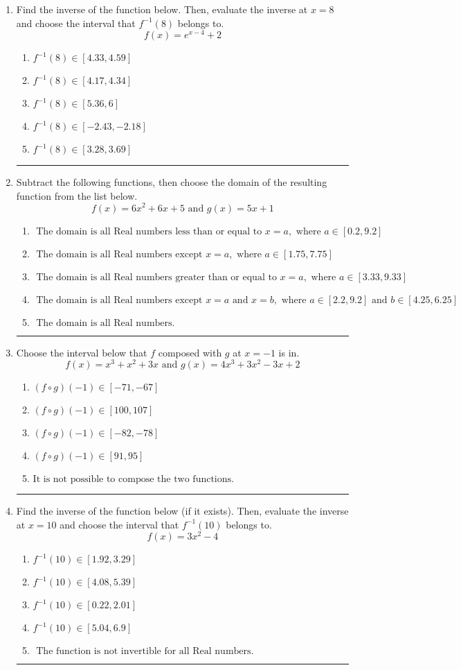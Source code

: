 \documentclass[14pt]{extbook}
\newcommand{\litem}[1]{\item#1\hspace*{-1cm}\rule{\textwidth}{0.4pt}}
\begin{document}
\begin{enumerate}
\litem{
Find the inverse of the function below. Then, evaluate the inverse at $x = 8$ and choose the interval that $f^{-1}(8)$ belongs to.\[ f(x) = e^{x-4}+2 \]\begin{enumerate}[label=\Alph*.]
\item \( f^{-1}(8) \in [4.33, 4.59] \)
\item \( f^{-1}(8) \in [4.17, 4.34] \)
\item \( f^{-1}(8) \in [5.36, 6] \)
\item \( f^{-1}(8) \in [-2.43, -2.18] \)
\item \( f^{-1}(8) \in [3.28, 3.69] \)

\end{enumerate} }
\litem{
Subtract the following functions, then choose the domain of the resulting function from the list below.\[ f(x) = 6x^{2} +6 x + 5 \text{ and } g(x) = 5x + 1 \]\begin{enumerate}[label=\Alph*.]
\item \( \text{ The domain is all Real numbers less than or equal to } x = a, \text{ where } a \in [0.2, 9.2] \)
\item \( \text{ The domain is all Real numbers except } x = a, \text{ where } a \in [1.75, 7.75] \)
\item \( \text{ The domain is all Real numbers greater than or equal to } x = a, \text{ where } a \in [3.33, 9.33] \)
\item \( \text{ The domain is all Real numbers except } x = a \text{ and } x = b, \text{ where } a \in [2.2, 9.2] \text{ and } b \in [4.25, 6.25] \)
\item \( \text{ The domain is all Real numbers. } \)

\end{enumerate} }
\litem{
Choose the interval below that $f$ composed with $g$ at $x=-1$ is in.\[ f(x) = x^{3} + x^{2} +3 x \text{ and } g(x) = 4x^{3} +3 x^{2} -3 x + 2 \]\begin{enumerate}[label=\Alph*.]
\item \( (f \circ g)(-1) \in [-71, -67] \)
\item \( (f \circ g)(-1) \in [100, 107] \)
\item \( (f \circ g)(-1) \in [-82, -78] \)
\item \( (f \circ g)(-1) \in [91, 95] \)
\item \( \text{It is not possible to compose the two functions.} \)

\end{enumerate} }
\litem{
Find the inverse of the function below (if it exists). Then, evaluate the inverse at $x = 10$ and choose the interval that $f^{-1}(10)$ belongs to.\[ f(x) = 3 x^2 - 4 \]\begin{enumerate}[label=\Alph*.]
\item \( f^{-1}(10) \in [1.92, 3.29] \)
\item \( f^{-1}(10) \in [4.08, 5.39] \)
\item \( f^{-1}(10) \in [0.22, 2.01] \)
\item \( f^{-1}(10) \in [5.04, 6.9] \)
\item \( \text{ The function is not invertible for all Real numbers. } \)


\end{enumerate}}
\end{enumerate}
\end{document}
